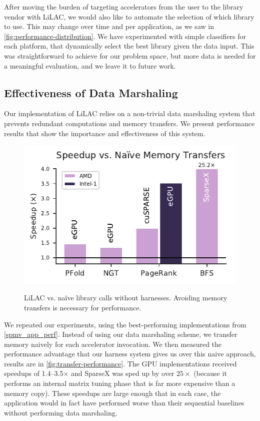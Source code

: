 After moving the burden of targeting accelerators from the user to the
library vendor with LiLAC, we would also like to automate the selection of which
library to use.
This may change over time and per application, as we saw in
\autoref{fig:performance-distribution}.
We have experimented with simple classifiers for each platform, that dynamically
select the best library given the data input.
This was straightforward to achieve for our problem space, but more data is
needed for a meaningful evaluation, and we leave it to future work.


\subsection{Effectiveness of Data Marshaling}
Our implementation of LiLAC relies on a non-trivial data marshaling system that
prevents redundant computations and memory transfers. We present performance
results that show the importance and effectiveness of this system.

\begin{figure}[t]
  \centering
  \includegraphics[width=\columnwidth,height=0.67\columnwidth]{figures/marshall.pdf}
\\[-0.75em]
  \caption{LiLAC vs. na\"ive library calls without harnesses.
           Avoiding memory transfers is necessary for performance.}
  \label{fig:transfer-performance}
\end{figure}

We repeated our experiments, using the best-performing implementations from
\autoref{spmv_app_perf}.
Instead of using our data marshaling scheme, we transfer memory naively for
each accelerator invocation.
We then measured the performance advantage that our harness system gives us over
this naive approach, results are in \autoref{fig:transfer-performance}.
The GPU implementations received speedups of 1.4--3.5$\times$ and SparseX was
sped up by over $25\times$ (because it performs an internal matrix tuning phase
that is far more expensive than a memory copy).
These speedups are large enough that in each case, the application would in fact
have performed worse than their sequential baselines without performing data
marshaling.

